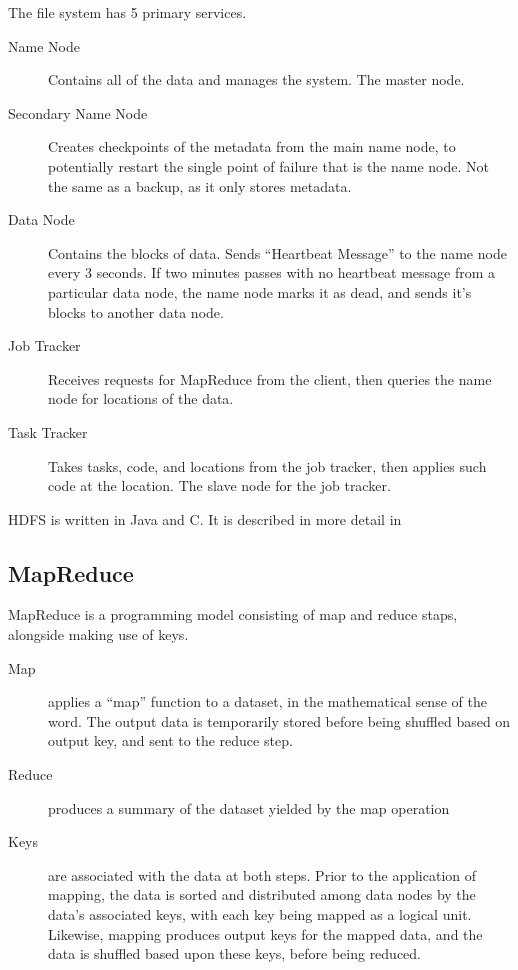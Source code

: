\documentclass[10pt,a4paper]{article}
\begin{document}
The file system has 5 primary services.

\begin{description}
	\item[Name Node] Contains all of the data and manages the system. The
	      master node.
	\item[Secondary Name Node] Creates checkpoints of the metadata from
	      the main name node, to potentially restart the single point of
	      failure that is the name node. Not the same as a backup, as it only
	      stores metadata.
	\item[Data Node] Contains the blocks of data. Sends ``Heartbeat
	      Message'' to the name node every 3 seconds. If two minutes passes
	      with no heartbeat message from a particular data node, the name node
	      marks it as dead, and sends it's blocks to another data node.
	\item[Job Tracker] Receives requests for MapReduce from the client,
	      then queries the name node for locations of the data.
	\item[Task Tracker] Takes tasks, code, and locations from the job
	      tracker, then applies such code at the location. The slave node for
	      the job tracker.
\end{description}

HDFS is written in Java and C. It is described in more detail in
\textcite{shvachko2010hadoop}

\subsection{MapReduce}
\label{sec:mapreduce}

MapReduce is a programming model consisting of map and reduce staps,
alongside making use of keys.

\begin{description}
	\item[Map] applies a ``map'' function to a dataset, in the
	      mathematical sense of the word. The output data is temporarily
	      stored before being shuffled based on output key, and sent to the
	      reduce step.
	\item[Reduce] produces a summary of the dataset yielded by the map operation
	\item[Keys] are associated with the data at both steps. Prior to the
	      application of mapping, the data is sorted and distributed among
	      data nodes by the data's associated keys, with each key being mapped
	      as a logical unit. Likewise, mapping produces output keys for the
	      mapped data, and the data is shuffled based upon these keys, before
	      being reduced.
\end{description}
\end{document}
